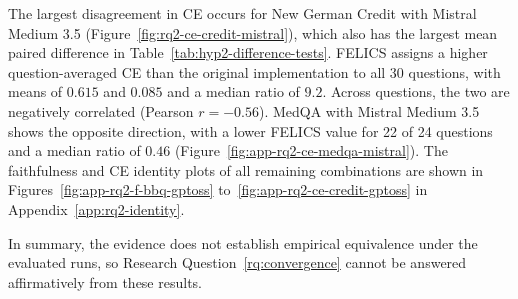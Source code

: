 The largest disagreement in CE occurs for New German Credit with Mistral Medium 3.5 (Figure~\ref{fig:rq2-ce-credit-mistral}), which also has the largest mean paired difference in Table~\ref{tab:hyp2-difference-tests}. FELICS assigns a higher question-averaged CE than the original implementation to all 30 questions, with means of $0.615$ and $0.085$ and a median ratio of $9.2$. Across questions, the two are negatively correlated (Pearson $r=-0.56$). MedQA with Mistral Medium 3.5 shows the opposite direction, with a lower FELICS value for 22 of 24 questions and a median ratio of $0.46$ (Figure~\ref{fig:app-rq2-ce-medqa-mistral}). The faithfulness and CE identity plots of all remaining combinations are shown in Figures~\ref{fig:app-rq2-f-bbq-gptoss} to~\ref{fig:app-rq2-ce-credit-gptoss} in Appendix~\ref{app:rq2-identity}.

In summary, the evidence does not establish empirical equivalence under the evaluated runs, so Research Question~\ref{rq:convergence} cannot be answered affirmatively from these results.
